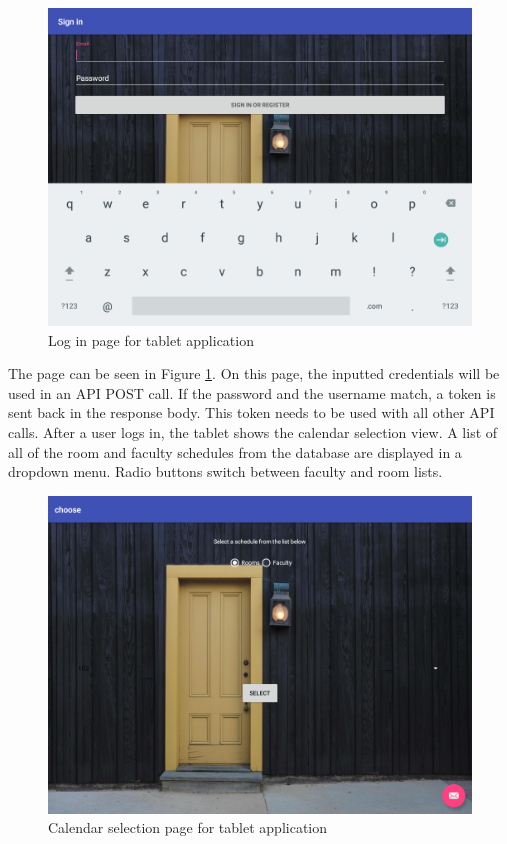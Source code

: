 \begin{figure}
  \includegraphics[scale=0.45]{login_final.png}
  \caption{Log in page for tablet application}
  \label{loginfinal}
\end{figure}

The page can be seen in Figure \ref{loginfinal}. On this page, the inputted credentials will be used in an API POST call.  If the password and the username match, a token is sent back in the response body.  This token needs to be used with all other API calls.  After a user logs in, the tablet shows the calendar selection view.  A list of all of the room and faculty schedules from the database are displayed in a dropdown menu.  Radio buttons switch between faculty and room lists.

\begin{figure}
  \includegraphics[scale=0.45]{selection_final.png}
  \caption{Calendar selection page for tablet application}
  \label{selectionfinal}
\end{figure}

